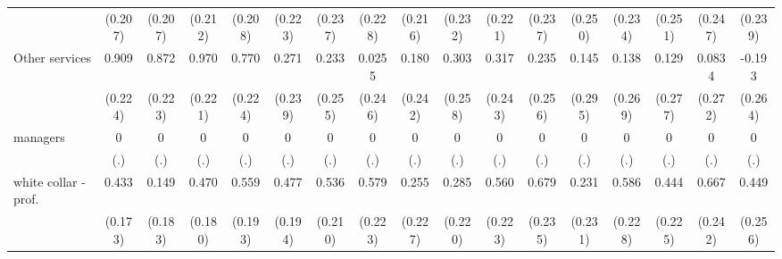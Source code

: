 {\begin{tabular}{l*{16}{c}}
                    &     (0.207)         &     (0.207)         &     (0.212)         &     (0.208)         &     (0.223)         &     (0.237)         &     (0.228)         &     (0.216)         &     (0.232)         &     (0.221)         &     (0.237)         &     (0.250)         &     (0.234)         &     (0.251)         &     (0.247)         &     (0.239)         \\
[1em]
Other services      &       0.909\sym{***}&       0.872\sym{***}&       0.970\sym{***}&       0.770\sym{***}&       0.271         &       0.233         &      0.0255         &       0.180         &       0.303         &       0.317         &       0.235         &       0.145         &       0.138         &       0.129         &      0.0834         &      -0.193         \\
                    &     (0.224)         &     (0.223)         &     (0.221)         &     (0.224)         &     (0.239)         &     (0.255)         &     (0.246)         &     (0.242)         &     (0.258)         &     (0.243)         &     (0.256)         &     (0.295)         &     (0.269)         &     (0.277)         &     (0.272)         &     (0.264)         \\
[1em]
managers            &           0         &           0         &           0         &           0         &           0         &           0         &           0         &           0         &           0         &           0         &           0         &           0         &           0         &           0         &           0         &           0         \\
                    &         (.)         &         (.)         &         (.)         &         (.)         &         (.)         &         (.)         &         (.)         &         (.)         &         (.)         &         (.)         &         (.)         &         (.)         &         (.)         &         (.)         &         (.)         &         (.)         \\
[1em]
white collar - prof.&       0.433\sym{*}  &       0.149         &       0.470\sym{**} &       0.559\sym{**} &       0.477\sym{*}  &       0.536\sym{*}  &       0.579\sym{**} &       0.255         &       0.285         &       0.560\sym{*}  &       0.679\sym{**} &       0.231         &       0.586\sym{*}  &       0.444\sym{*}  &       0.667\sym{**} &       0.449         \\
                    &     (0.173)         &     (0.183)         &     (0.180)         &     (0.193)         &     (0.194)         &     (0.210)         &     (0.223)         &     (0.227)         &     (0.220)         &     (0.223)         &     (0.235)         &     (0.231)         &     (0.228)         &     (0.225)         &     (0.242)         &     (0.256)         \\

\end{tabular}}
